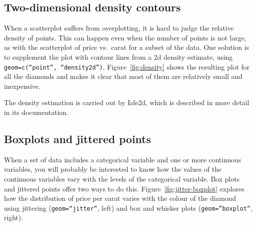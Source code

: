 % 


\subsection{Two-dimensional density contours}
\label{sub:density2d}

When a scatterplot suffers from overplotting, it is hard to judge the relative density of points.  This can happen even when the number of points is not large, as with the scatterplot of price vs.\ carat for a subset of the data.  One solution is to supplement the plot with contour lines from a 2d density estimate, using {\tt geom=c(``point'', ``density2d'')}.  Figure~\ref{fig:density} shows the resulting plot for all the diamonds and makes it clear that most of them are relatively small and inexpensive.

% 


The density estimation is carried out by \f{kde2d}, which is described in more detail in its documentation.

\subsection{Boxplots and jittered points}
\label{sub:boxplot}

When a set of data includes a categorical variable and one or more continuous variables, you will probably be interested to know how the values of the continuous variables vary with the levels of the categorical variable.  Box plots and jittered points offer two ways to do this.  Figure~\ref{fig:jitter-boxplot} explores how the distribution of price per carat varies with the colour of the diamond using jittering ({\tt geom=``jitter''}, left) and box and whisker plots ({\tt geom=''boxplot''}, right).

% 


